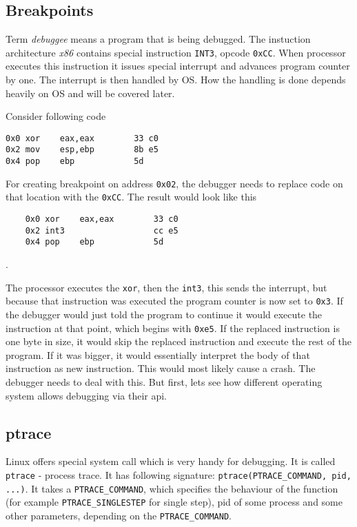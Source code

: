 \subsection{Breakpoints}
Term \textit{debuggee} means a program that is being debugged. The instuction architecture \textit{x86} contains special instruction \lstinline{INT3}, opcode \lstinline{0xCC}. When processor executes this instruction it issues special interrupt and advances program counter by one. The interrupt is then handled by OS. How the handling is done depends heavily on OS and will be covered later. 

Consider following code
\begin{lstlisting}
0x0 xor    eax,eax        33 c0
0x2 mov    esp,ebp        8b e5
0x4 pop    ebp            5d
\end{lstlisting}

For creating breakpoint on address \lstinline{0x02}, the debugger needs to replace code on that location with the \lstinline{0xCC}. The result would look like this 

\begin{lstlisting}
    0x0 xor    eax,eax        33 c0
    0x2 int3                  cc e5
    0x4 pop    ebp            5d
\end{lstlisting}.

The processor executes the \lstinline{xor}, then the \lstinline{int3}, this sends the interrupt, but because that instruction was executed the program counter is now set to \lstinline{0x3}. If the debugger would just told the program to continue it would execute the instruction at that point, which begins with \lstinline{0xe5}. If the replaced instruction is one byte in size, it would skip the replaced instruction and execute the rest of the program. If it was bigger, it would essentially interpret the body of that instruction as new instruction. This would most likely cause a crash. The debugger needs to deal with this. But first, lets see how different operating system allows debugging via their api.

\subsection{ptrace}
Linux offers special system call which is very handy for debugging. It is called \lstinline{ptrace} \cite{ptrace} - process trace. It has following signature: \lstinline{ptrace(PTRACE_COMMAND, pid, ...)}. It takes a \lstinline{PTRACE_COMMAND}, which specifies the behaviour of the function (for example \lstinline{PTRACE_SINGLESTEP} for single step), pid of some process and some other parameters, depending on the \lstinline{PTRACE_COMMAND}. 

